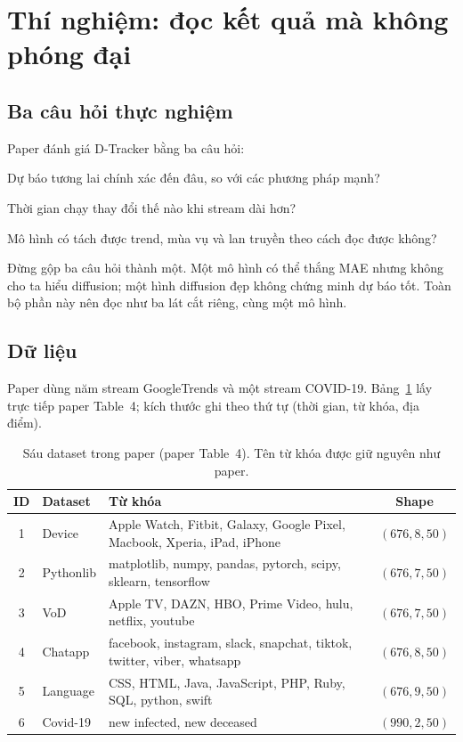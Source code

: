 \section{Thí nghiệm: đọc kết quả mà không phóng đại}
\label{sec:experiments}

\subsection{Ba câu hỏi thực nghiệm}

Paper đánh giá D-Tracker bằng ba câu hỏi:
\begin{description}[leftmargin=1.8em,style=nextline]
  \item[Q1 --- Accuracy.] Dự báo tương lai chính xác đến đâu, so với các phương pháp mạnh?
  \item[Q2 --- Scalability.] Thời gian chạy thay đổi thế nào khi stream dài hơn?
  \item[Q3 --- Effectiveness.] Mô hình có tách được trend, mùa vụ và lan truyền theo cách đọc được không?
\end{description}
Đừng gộp ba câu hỏi thành một. Một mô hình có thể thắng MAE nhưng không cho ta hiểu diffusion; một
hình diffusion đẹp không chứng minh dự báo tốt. Toàn bộ phần này nên đọc như ba lát cắt riêng,
cùng một mô hình.

\subsection{Dữ liệu}

Paper dùng năm stream GoogleTrends và một stream COVID-19. Bảng~\ref{tab:datasets} lấy trực tiếp
paper Table~4; kích thước ghi theo thứ tự (thời gian, từ khóa, địa điểm).

\begin{table}[htbp]
  \centering
  \small
  \caption{Sáu dataset trong paper (paper Table~4). Tên từ khóa được giữ nguyên như paper.}
  \label{tab:datasets}
  \begin{tabular}{@{}cl>{\raggedright\arraybackslash}p{5.6cm}c@{}}
    \toprule
    ID & Dataset & Từ khóa & Shape \\
    \midrule
    1 & Device & Apple Watch, Fitbit, Galaxy, Google Pixel, Macbook, Xperia, iPad, iPhone & $(676,8,50)$ \\
    2 & Pythonlib & matplotlib, numpy, pandas, pytorch, scipy, sklearn, tensorflow & $(676,7,50)$ \\
    3 & VoD & Apple TV, DAZN, HBO, Prime Video, hulu, netflix, youtube & $(676,7,50)$ \\
    4 & Chatapp & facebook, instagram, slack, snapchat, tiktok, twitter, viber, whatsapp & $(676,8,50)$ \\
    5 & Language & CSS, HTML, Java, JavaScript, PHP, Ruby, SQL, python, swift & $(676,9,50)$ \\
    6 & Covid-19 & new infected, new deceased & $(990,2,50)$ \\
    \bottomrule
  \end{tabular}
\end{table}

